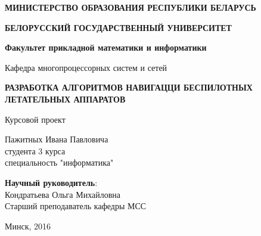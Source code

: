 \begin{titlepage}
    \begin{center}
         \textbf{МИНИСТЕРСТВО ОБРАЗОВАНИЯ РЕСПУБЛИКИ БЕЛАРУСЬ}
    \end{center}
    \begin{center}
         \textbf{БЕЛОРУССКИЙ ГОСУДАРСТВЕННЫЙ УНИВЕРСИТЕТ}
    \end{center}
    \begin{center}
         \textbf{Факультет прикладной математики и информатики}
    \end{center}
    \begin{center}
        Кафедра многопроцессорных систем и сетей
    \end{center}
    
    \vspace{9em}
    
    \begin{center}
        \textbf{РАЗРАБОТКА АЛГОРИТМОВ НАВИГАЦЦИ БЕСПИЛОТНЫХ ЛЕТАТЕЛЬНЫХ АППАРАТОВ}
    \end{center}
    
    \vspace{2em}
    
    \begin{center}
        Курсовой проект
    \end{center}
    
    \vspace{4em}
    
    \begin{flushright}
        Пажитных Ивана Павловича\\
        студента 3 курса\\
        специальность "информатика"\\
    \end{flushright}
    
    \vspace{1em}
    
    \begin{flushright}
         \textbf{Научный руководитель}:\\
        Кондратьева Ольга Михайловна\\
        Старший преподаватель кафедры МСС\\
    \end{flushright}
    
    \vfill
    
    \begin{center}
        Минск, 2016
    \end{center}
\end{titlepage}
\newpage
